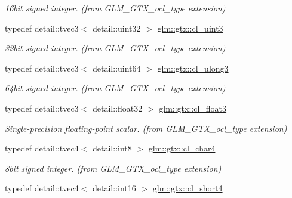 \begin{DoxyCompactItemize}
\begin{DoxyCompactList}\small\item\em 16bit signed integer. (from G\+L\+M\+\_\+\+G\+T\+X\+\_\+ocl\+\_\+type extension) \end{DoxyCompactList}\item 
\hypertarget{group__gtx__ocl__type_gab18c9cf09b63796fe06638181b3eafc1}{}typedef detail\+::tvec3$<$ detail\+::uint32 $>$ \hyperlink{group__gtx__ocl__type_gab18c9cf09b63796fe06638181b3eafc1}{glm\+::gtx\+::cl\+\_\+uint3}\label{group__gtx__ocl__type_gab18c9cf09b63796fe06638181b3eafc1}

\begin{DoxyCompactList}\small\item\em 32bit signed integer. (from G\+L\+M\+\_\+\+G\+T\+X\+\_\+ocl\+\_\+type extension) \end{DoxyCompactList}\item 
\hypertarget{group__gtx__ocl__type_gaea31c495fe2239999a451c33544a5746}{}typedef detail\+::tvec3$<$ detail\+::uint64 $>$ \hyperlink{group__gtx__ocl__type_gaea31c495fe2239999a451c33544a5746}{glm\+::gtx\+::cl\+\_\+ulong3}\label{group__gtx__ocl__type_gaea31c495fe2239999a451c33544a5746}

\begin{DoxyCompactList}\small\item\em 64bit signed integer. (from G\+L\+M\+\_\+\+G\+T\+X\+\_\+ocl\+\_\+type extension) \end{DoxyCompactList}\item 
\hypertarget{group__gtx__ocl__type_gaca9dcc3a8c86be55b8ecc239569e600f}{}typedef detail\+::tvec3$<$ detail\+::float32 $>$ \hyperlink{group__gtx__ocl__type_gaca9dcc3a8c86be55b8ecc239569e600f}{glm\+::gtx\+::cl\+\_\+float3}\label{group__gtx__ocl__type_gaca9dcc3a8c86be55b8ecc239569e600f}

\begin{DoxyCompactList}\small\item\em Single-\/precision floating-\/point scalar. (from G\+L\+M\+\_\+\+G\+T\+X\+\_\+ocl\+\_\+type extension) \end{DoxyCompactList}\item 
\hypertarget{group__gtx__ocl__type_ga2d4184438b0dc1a29c99cd3d5f3245fc}{}typedef detail\+::tvec4$<$ detail\+::int8 $>$ \hyperlink{group__gtx__ocl__type_ga2d4184438b0dc1a29c99cd3d5f3245fc}{glm\+::gtx\+::cl\+\_\+char4}\label{group__gtx__ocl__type_ga2d4184438b0dc1a29c99cd3d5f3245fc}

\begin{DoxyCompactList}\small\item\em 8bit signed integer. (from G\+L\+M\+\_\+\+G\+T\+X\+\_\+ocl\+\_\+type extension) \end{DoxyCompactList}\item 
\hypertarget{group__gtx__ocl__type_ga976a8cb8c05f9c8a346c92e4d0bc6efa}{}typedef detail\+::tvec4$<$ detail\+::int16 $>$ \hyperlink{group__gtx__ocl__type_ga976a8cb8c05f9c8a346c92e4d0bc6efa}{glm\+::gtx\+::cl\+\_\+short4}\label{group__gtx__ocl__type_ga976a8cb8c05f9c8a346c92e4d0bc6efa}


\end{DoxyCompactItemize}
